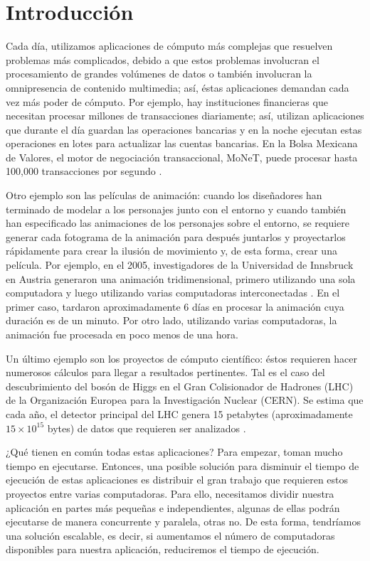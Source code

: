 \chapter{Introducción}

Cada día, utilizamos aplicaciones de cómputo más complejas que resuelven problemas más complicados, debido a que estos problemas involucran el procesamiento de grandes volúmenes de datos o también involucran la omnipresencia de contenido multimedia; así, éstas aplicaciones demandan cada vez más poder de cómputo. Por ejemplo, hay instituciones financieras que necesitan procesar millones de transacciones diariamente; así, utilizan aplicaciones que durante el día guardan las operaciones bancarias y en la noche ejecutan estas operaciones en lotes para actualizar las cuentas bancarias. En la Bolsa Mexicana de Valores, el motor de negociación transaccional, MoNeT, puede procesar hasta 100,000 transacciones por segundo \cite{bmv2012informe}. 

Otro ejemplo son las películas de animación: cuando los diseñadores han terminado de modelar a los personajes junto con el entorno y cuando también han especificado las animaciones de los personajes sobre el entorno, se requiere generar cada fotograma de la animación para después juntarlos y proyectarlos rápidamente para crear la ilusión de movimiento y, de esta forma, crear una película. Por ejemplo, en el 2005, investigadores de la Universidad de Innsbruck en Austria generaron una animación tridimensional, primero utilizando una sola computadora y luego utilizando varias computadoras interconectadas \cite{nerieri2005using}. En el primer caso, tardaron aproximadamente 6 días en procesar la animación cuya duración es de un minuto. Por otro lado, utilizando varias computadoras, la animación fue procesada en poco menos de una hora.

Un último ejemplo son los proyectos de cómputo científico: éstos requieren hacer numerosos cálculos para llegar a resultados pertinentes. Tal es el caso del descubrimiento del bosón de Higgs en el Gran Colisionador de Hadrones (LHC) de la Organización Europea para la Investigación Nuclear (CERN). Se estima que cada año, el detector principal del LHC genera 15 petabytes (aproximadamente $15 \times 10^{15}$ bytes) de datos que requieren ser analizados \cite{shiers2007worldwide}. 

¿Qué tienen en común todas estas aplicaciones? Para empezar, toman mucho tiempo en ejecutarse. Entonces, una posible solución para disminuir el tiempo de ejecución de estas aplicaciones es distribuir el gran trabajo que requieren estos proyectos entre varias computadoras. Para ello, necesitamos dividir nuestra aplicación en partes más pequeñas e independientes, algunas de ellas podrán ejecutarse de manera concurrente y paralela, otras no. De esta forma, tendríamos una solución escalable, es decir, si aumentamos el número de computadoras disponibles para nuestra aplicación, reduciremos el tiempo de ejecución.

